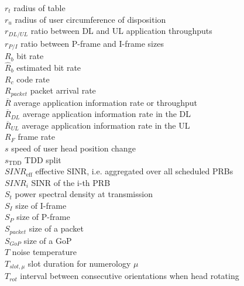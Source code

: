 $r_t$ \mytab radius of table \\
$r_u$ \mytab radius of user circumference of disposition\\
$r_{DL/UL}$ \mytab ratio between \acs{DL} and \acs{UL} application throughputs\\
$r_{P/I}$ \mytab ratio between P-frame and I-frame sizes\\
$R_b$ \mytab bit rate \\
$\hat{R}_b$ \mytab estimated bit rate \\
$R_c$ \mytab code rate \\
$R_{packet}$ \mytab packet arrival rate \\
$\overline{R}$ \mytab average application information rate or throughput \\
$\overline{R}_{DL}$ \mytab average application information rate in the \ac{DL}\\
$\overline{R}_{UL}$ \mytab average application information rate in the \ac{UL}\\
$R_F$ \mytab frame rate \\


$s$ \mytab speed of user head position change \\
$s_\text{TDD}$ \mytab \acs{TDD} split \\
$SINR_\text{eff}$ \mytab effective \acs{SINR}, i.e. aggregated over all scheduled PRBs \\
$SINR_i$ \mytab SINR of the i-th \acs{PRB} \\
$S_t$ \mytab power spectral density at transmission\\
$S_I$ \mytab size of I-frame\\
$S_P$ \mytab size of P-frame\\
$S_{packet}$ \mytab size of a packet\\
$S_{GoP}$ \mytab size of a \acs{GoP}\\

$T$ \mytab noise temperature\\
$T_{slot, \mu}$ \mytab slot duration for numerology $\mu$\\
$T_{rot}$ \mytab interval between consecutive orientations when head rotating\\






